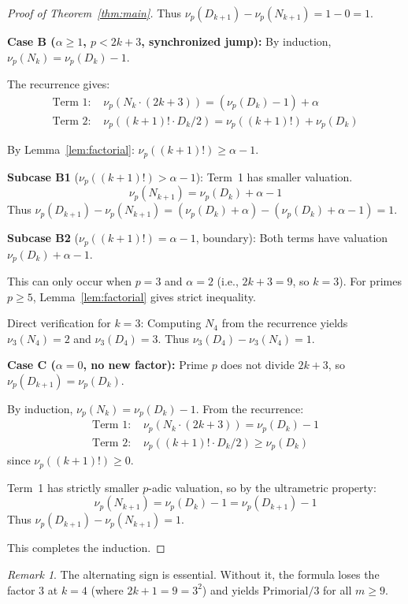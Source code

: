 \documentclass[11pt]{article}
\theoremstyle{definition}
\theoremstyle{remark}
\newtheorem{remark}[theorem]{Remark}
\begin{document}
\begin{proof}[Proof of Theorem~\ref{thm:main}]
Thus $\nu_p(D_{k+1}) - \nu_p(N_{k+1}) = 1 - 0 = 1$. \checkmark

\textbf{Case B ($\alpha \geq 1$, $p < 2k+3$, synchronized jump):}
By induction, $\nu_p(N_k) = \nu_p(D_k) - 1$.

The recurrence gives:
\begin{align*}
\text{Term 1: } & \nu_p(N_k \cdot (2k+3)) = (\nu_p(D_k) - 1) + \alpha \\
\text{Term 2: } & \nu_p((k+1)! \cdot D_k/2) = \nu_p((k+1)!) + \nu_p(D_k)
\end{align*}

By Lemma~\ref{lem:factorial}: $\nu_p((k+1)!) \geq \alpha - 1$.

\textbf{Subcase B1} ($\nu_p((k+1)!) > \alpha - 1$): Term~1 has smaller valuation.
\[
\nu_p(N_{k+1}) = \nu_p(D_k) + \alpha - 1
\]
Thus $\nu_p(D_{k+1}) - \nu_p(N_{k+1}) = (\nu_p(D_k) + \alpha) - (\nu_p(D_k) + \alpha - 1) = 1$. \checkmark

\textbf{Subcase B2} ($\nu_p((k+1)!) = \alpha - 1$, boundary):
Both terms have valuation $\nu_p(D_k) + \alpha - 1$.

This can only occur when $p = 3$ and $\alpha = 2$ (i.e., $2k+3 = 9$, so $k = 3$).
For primes $p \geq 5$, Lemma~\ref{lem:factorial} gives strict inequality.

Direct verification for $k = 3$: Computing $N_4$ from the recurrence yields
$\nu_3(N_4) = 2$ and $\nu_3(D_4) = 3$.
Thus $\nu_3(D_4) - \nu_3(N_4) = 1$. \checkmark

\textbf{Case C ($\alpha = 0$, no new factor):}
Prime $p$ does not divide $2k+3$, so $\nu_p(D_{k+1}) = \nu_p(D_k)$.

By induction, $\nu_p(N_k) = \nu_p(D_k) - 1$. From the recurrence:
\begin{align*}
\text{Term 1: } & \nu_p(N_k \cdot (2k+3)) = \nu_p(D_k) - 1 \\
\text{Term 2: } & \nu_p((k+1)! \cdot D_k/2) \geq \nu_p(D_k)
\end{align*}
since $\nu_p((k+1)!) \geq 0$.

Term~1 has strictly smaller $p$-adic valuation, so by the ultrametric property:
\[
\nu_p(N_{k+1}) = \nu_p(D_k) - 1 = \nu_p(D_{k+1}) - 1
\]
Thus $\nu_p(D_{k+1}) - \nu_p(N_{k+1}) = 1$. \checkmark

This completes the induction.
\end{proof}

\begin{remark}
The alternating sign is essential. Without it, the formula loses the
factor 3 at $k = 4$ (where $2k+1 = 9 = 3^2$) and yields $\text{Primorial}/3$
for all $m \geq 9$.
\end{remark}



\end{document}
